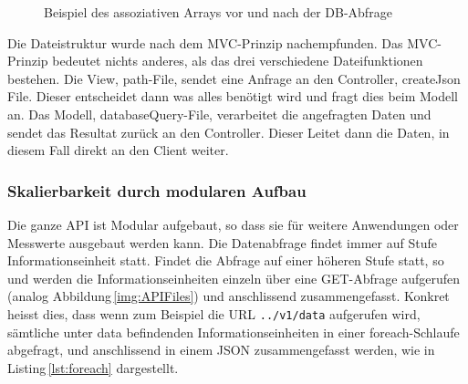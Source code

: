 \begin{figure}[htbp!]
	\centering
	\caption{Beispiel des assoziativen Arrays vor und nach der DB-Abfrage}
	\label{img:assozArray}
\end{figure}


\noindent

Die Dateistruktur wurde nach dem MVC-Prinzip nachempfunden. Das MVC-Prinzip bedeutet nichts anderes, als das drei verschiedene Dateifunktionen bestehen. Die View, path-File, sendet eine Anfrage an den Controller, createJson File. Dieser entscheidet dann was alles benötigt wird und fragt dies beim Modell an. Das Modell, databaseQuery-File, verarbeitet die angefragten Daten und sendet das Resultat zurück an den Controller. Dieser Leitet dann die Daten, in diesem Fall direkt an den Client weiter.


\subsubsection{Skalierbarkeit durch modularen Aufbau}
Die ganze API ist Modular aufgebaut, so dass sie für weitere Anwendungen oder Messwerte ausgebaut werden kann. Die Datenabfrage findet immer auf Stufe Informationseinheit statt. Findet die Abfrage auf einer höheren Stufe statt, so und werden die Informationseinheiten einzeln über eine GET-Abfrage aufgerufen (analog Abbildung\,\ref{img:APIFiles}) und anschlissend zusammengefasst. Konkret heisst dies, dass wenn zum Beispiel die URL \texttt{../v1/data} aufgerufen wird, sämtliche unter data befindenden Informationseinheiten in einer foreach-Schlaufe abgefragt, und anschlissend in einem JSON zusammengefasst werden, wie in Listing\,\ref{lst:foreach} dargestellt.

